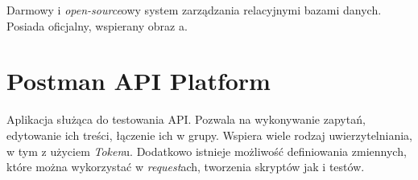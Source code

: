 \par Darmowy i \emph{open-source}owy system zarządzania relacyjnymi bazami danych. Posiada oficjalny, wspierany obraz \emph{\docker}a.

\section{Postman API Platform}

\par Aplikacja służąca do testowania API. Pozwala na wykonywanie zapytań, edytowanie ich treści, łączenie ich w grupy. Wspiera wiele rodzaj uwierzytelniania, w tym z użyciem \emph{Token}u. Dodatkowo istnieje możliwość definiowania zmiennych, które można wykorzystać w \emph{request}ach, tworzenia skryptów jak i testów.